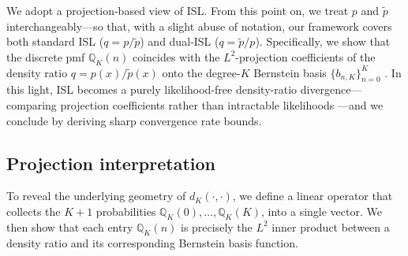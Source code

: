 \documentclass{article}
\begin{document}



We adopt a projection‐based view of ISL. From this point on, we treat $p$ and $\tilde p$ interchangeably—so that, with a slight abuse of notation, our framework covers both standard ISL ($q=p/\tilde p$) and dual‐ISL ($q=\tilde p/p$).  Specifically, we show that the discrete pmf $\mathbb{Q}_K(n)$ coincides with the $L^2$-projection coefficients of the density ratio $q=p(x)/\tilde p(x)$ onto the degree-$K$ Bernstein basis $\{b_{n,K}\}_{n=0}^K$ .  In this light, ISL becomes a purely likelihood-free density-ratio divergence—comparing projection coefficients rather than intractable likelihoods —and we conclude by deriving sharp convergence rate bounds.


\subsection{Projection interpretation}

To reveal the underlying geometry of $d_{K}(\cdot, \cdot)$, we define a linear operator that collects the $K+1$ probabilities $\mathbb{Q}_{K}(0), \ldots, \mathbb{Q}_{K}(K)$, into a single vector. We then show that each entry $\mathbb{Q}_{K}(n)$ is precisely the $L^2$ inner product between a density ratio and its corresponding Bernstein basis function.
\end{document}
